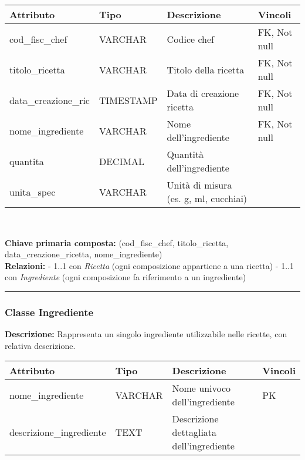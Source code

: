 \documentclass[a4paper, 12pt]{article}
\begin{document}
        {
        \vspace{1em}
        \renewcommand{\arraystretch}{1.3}
        \begin{tabularx}{\textwidth}{|l|l|X|l|}
        \hline
        \textbf{Attributo} & \textbf{Tipo} & \textbf{Descrizione} & \textbf{Vincoli} \\
        \hline
        cod\_fisc\_chef       & VARCHAR        & Codice chef & FK, Not null \\
        titolo\_ricetta       & VARCHAR        & Titolo della ricetta & FK, Not null \\
        data\_creazione\_ric  & TIMESTAMP      & Data di creazione ricetta & FK, Not null \\
        nome\_ingrediente     & VARCHAR        & Nome dell’ingrediente & FK, Not null \\
        quantita              & DECIMAL        & Quantità dell’ingrediente & \\
        unita\_spec           & VARCHAR        & Unità di misura (es. g, ml, cucchiai) & \\
        \hline
        \end{tabularx}\\[0.5em]
        }
        
        \noindent\textbf{Chiave primaria composta:} (cod\_fisc\_chef, titolo\_ricetta, data\_creazione\_ricetta, nome\_ingrediente)\\[0.1em]  
        
        \noindent\textbf{Relazioni:}  
        - 1..1 con \textit{Ricetta} (ogni composizione appartiene a una ricetta)  
        - 1..1 con \textit{Ingrediente} (ogni composizione fa riferimento a un ingrediente)

    \noindent\rule{\textwidth}{0.1pt}

    \subsubsection*{Classe Ingrediente}
        \textbf{Descrizione:} Rappresenta un singolo ingrediente utilizzabile nelle ricette, con relativa descrizione.
        
        {
        \vspace{1em}
        \renewcommand{\arraystretch}{1.3}
        \begin{tabularx}{\textwidth}{|l|l|X|l|}
        \hline
        \textbf{Attributo} & \textbf{Tipo} & \textbf{Descrizione} & \textbf{Vincoli} \\
        \hline
        nome\_ingrediente      & VARCHAR       & Nome univoco dell’ingrediente & PK \\
        descrizione\_ingrediente & TEXT        & Descrizione dettagliata dell’ingrediente & \\
        \hline
        \end{tabularx}\\[0.5em]
        }
        
\end{document}
